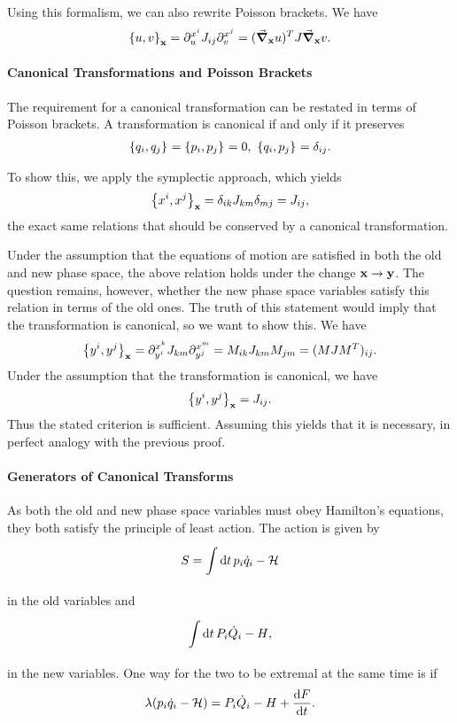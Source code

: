 Using this formalism, we can also rewrite Poisson brackets. We have
\begin{align*}
	\pob[\vb{x}]{u}{v} = \del{x^{i}}{u}J_{ij}\del{x^{j}}{v} = (\grad_{\vb{x}}{u})^{T}J\grad_{\vb{x}}{v}.
\end{align*}

\paragraph{Canonical Transformations and Poisson Brackets}
The requirement for a canonical transformation can be restated in terms of Poisson brackets. A transformation is canonical if and only if it preserves
\begin{align*}
	\pob{q_{i}}{q_{j}} = \pob{p_{i}}{p_{j}} = 0,\ \pob{q_{i}}{p_{j}} = \delta_{ij}.
\end{align*}

To show this, we apply the symplectic approach, which yields
\begin{align*}
	\pob[\vb{x}]{x^{i}}{x^{j}} = \delta_{ik}J_{km}\delta_{mj} = J_{ij},
\end{align*}
the exact same relations that should be conserved by a canonical transformation.

Under the assumption that the equations of motion are satisfied in both the old and new phase space, the above relation holds under the change $\vb{x} \to \vb{y}$. The question remains, however, whether the new phase space variables satisfy this relation in terms of the old ones. The truth of this statement would imply that the transformation is canonical, so we want to show this. We have
\begin{align*}
	\pob[\vb{x}]{y^{i}}{y^{j}} =  \del{x^{k}}{y^{i}}J_{km}\del{x^{m}}{y^{j}} = M_{ik}J_{km}M_{jm} = (MJM^{T})_{ij}.
\end{align*}
Under the assumption that the transformation is canonical, we have
\begin{align*}
	\pob[\vb{x}]{y^{i}}{y^{j}} = J_{ij}.
\end{align*}
Thus the stated criterion is sufficient. Assuming this yields that it is necessary, in perfect analogy with the previous proof.

\paragraph{Generators of Canonical Transforms}
As both the old and new phase space variables must obey Hamilton's equations, they both satisfy the principle of least action. The action is given by
\begin{align*}
	S = \inte{}{}\dd{t}{p_{i}\dot{q}_{i} - \ham}
\end{align*}
in the old variables and
\begin{align*}
	\inte{}{}\dd{t}{P_{i}\dot{Q}_{i} - H},
\end{align*}
in the new variables. One way for the two to be extremal at the same time is if
\begin{align*}
	\lambda(p_{i}\dot{q}_{i} - \ham) = P_{i}\dot{Q}_{i} - H + \dv{F}{t}.
\end{align*}

